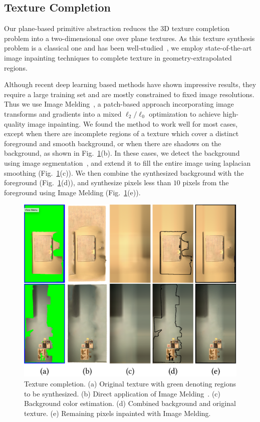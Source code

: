 \subsection{Texture Completion}
\label{subsec:3dlite-inpaint}
Our plane-based primitive abstraction reduces the 3D texture completion problem into a two-dimensional one over plane textures.
As this texture synthesis problem is a classical one and has been well-studied~\cite{criminisi2004region,simakov2008summarizing,barnes2009patchmatch,darabi2012image,wang2016unsupervised,pathak2016context,yang2016high}, we employ state-of-the-art image inpainting techniques to complete texture in geometry-extrapolated regions.

Although recent deep learning based methods have shown impressive results, they require a large training set and are mostly constrained to fixed image resolutions. 
Thus we use Image Melding~\cite{darabi2012image}, a patch-based approach incorporating image transforms and gradients into a mixed $\ell_2/\ell_0$ optimization to achieve high-quality image inpainting.
We found the method to work well for most cases, except when there are incomplete regions of a texture which cover a distinct foreground and smooth background, or when there are shadows on the background, as shown in Fig.~\ref{fig:3dlite-synthesize}(b).
In these cases, we detect the background using image segmentation~\cite{felzenszwalb2004efficient}, and extend it to fill the entire image using laplacian smoothing (Fig.~\ref{fig:3dlite-synthesize}(c)).
We then combine the synthesized background with the foreground (Fig.~\ref{fig:3dlite-synthesize}(d)), and synthesize pixels less than $10$ pixels from the foreground using Image Melding (Fig.~\ref{fig:3dlite-synthesize}(e)).

\begin{figure}
	\centering
    \includegraphics[width=0.8\linewidth]{3dlite/fig10.png}
	\caption{Texture completion. (a) Original texture with green denoting regions to be synthesized. (b) Direct application of Image Melding~\cite{darabi2012image}. (c) Background color estimation. (d) Combined background and original texture. (e) Remaining pixels inpainted with Image Melding.}
	\label{fig:3dlite-synthesize}
\end{figure}

